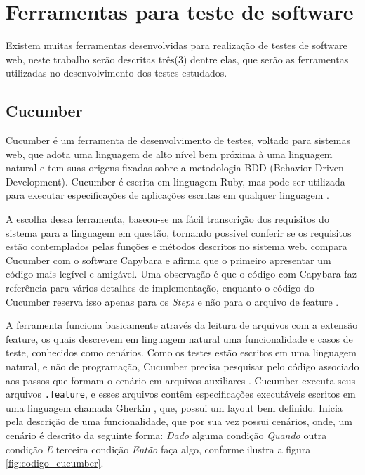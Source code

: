 \documentclass[tg]{mdtufsm}
\begin{document}
\section{Ferramentas para teste de software}
Existem muitas ferramentas desenvolvidas para realização de testes de software web, neste trabalho serão descritas três(3) dentre elas, que serão as ferramentas utilizadas no desenvolvimento dos testes estudados.

\subsection{Cucumber}
Cucumber é um ferramenta de desenvolvimento de testes, voltado para sistemas web, que adota uma linguagem de alto nível bem próxima à uma linguagem natural e tem suas origens fixadas sobre a metodologia BDD (Behavior Driven Development). Cucumber é escrita em linguagem Ruby, mas pode ser utilizada para executar especificações de aplicações escritas em qualquer linguagem \cite{nunescucumber}.

A escolha dessa ferramenta, baseou-se na fácil transcrição dos requisitos do sistema para a linguagem em questão, tornando possível conferir se os requisitos estão contemplados pelas funções e métodos descritos no sistema web. \citeauthor{lopescucumbervalor}\cite{lopescucumbervalor} compara Cucumber com o software Capybara e afirma que o primeiro apresentar um código mais legível e amigável. Uma observação é que o código com Capybara faz referência para vários detalhes de implementação, enquanto o código do Cucumber reserva isso apenas para os \emph{Steps} e não para o arquivo de feature \cite{lopescucumbervalor}.

A ferramenta funciona basicamente através da leitura de arquivos com a extensão feature, os quais descrevem em linguagem natural uma funcionalidade e casos de teste, conhecidos como cenários.
Como os testes estão escritos em uma linguagem natural, e não de programação, Cucumber precisa pesquisar pelo código associado aos passos que formam o cenário em arquivos auxiliares \cite{scmitzcucumberreview}. Cucumber executa seus arquivos \texttt{.feature}, e esses arquivos contêm especificações executáveis escritos em uma linguagem chamada Gherkin \cite{cucumberwiki}, que, possui um layout bem definido. Inicia pela descrição de uma funcionalidade, que por sua vez possui cenários, onde, um cenário é descrito da seguinte forma: \emph{Dado} alguma condição \emph{Quando} outra condição \emph{E} terceira condição \emph{Então} faça algo, conforme ilustra a figura \ref{fig:codigo_cucumber}.
\end{document}
